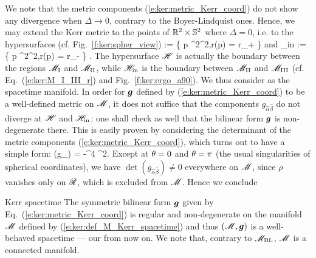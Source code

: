 We note that the metric components (\ref{e:ker:metric_Kerr_coord}) do not show any divergence when
$\Delta\rightarrow 0$, contrary to the Boyer-Lindquist ones. Hence, we may extend
the Kerr metric to the points of $\mathbb{R}^2\times\mathbb{S}^2$ where $\Delta=0$, i.e.
to the hypersurfaces (cf. Fig.~\ref{f:ker:spher_view})
\be \label{e:ker:def_H}
    \Hor := \left\{ p \in \R^2\times\SS^2,\quad r(p) = r_+ \right\}
\ee
and
\be \label{e:ker:def_H_in}
    \Hor_{\rm in} := \left\{ p \in \R^2\times\SS^2,\quad r(p) = r_- \right\} .
\ee
The hypersurface $\mathscr{H}$ is actually the boundary between the regions $\mathscr{M}_{\rm I}$
and $\mathscr{M}_{\rm II}$, while $\mathscr{H}_{\rm in}$ is the boundary between $\mathscr{M}_{\rm II}$
and $\mathscr{M}_{\rm III}$ (cf. Eq.~(\ref{e:ker:M_I_III_r}) and Fig.~\ref{f:ker:ergo_a90}).
We thus consider
\be \label{e:ker:def_M_Kerr_spacetime}
\ee
as the spacetime manifold. In order for $\bm{g}$ defined by (\ref{e:ker:metric_Kerr_coord})
to be a well-defined metric on $\mathscr{M}$, it does not suffice that the components
$g_{\hat{\alpha}\hat{\beta}}$ do not diverge at $\mathscr{H}$ and $\mathscr{H}_{\rm in}$: one shall
check as well that the bilinear form $\bm{g}$ is non-degenerate there.
This is easily proven by considering the determinant of the metric components
(\ref{e:ker:metric_Kerr_coord}),
which turns out to have a simple form:
\be
    \det (g_{\hat{\alpha}\hat{\beta}}) = -\rho^4 \sin^2\th .
\ee
Except at $\theta=0$ and $\theta=\pi$ (the usual singularities of spherical coordinates),
we have $\det (g_{\hat{\alpha}\hat{\beta}}) \neq 0$ everywhere on $\mathscr{M}$, since
$\rho$ vanishes only on $\mathscr{R}$, which is excluded from $\mathscr{M}$.
Hence we conclude
\begin{tprop}{Kerr spacetime}{}
The symmetric bilinear form $\bm{g}$ given by Eq.~(\ref{e:ker:metric_Kerr_coord})
is regular and non-degenerate on the manifold $\mathscr{M}$
defined by (\ref{e:ker:def_M_Kerr_spacetime}) and thus
$(\mathscr{M},\bm{g})$ is a well-behaved spacetime --- our 
from now on. We note that, contrary to $\mathscr{M}_{\rm BL}$, $\mathscr{M}$ is a connected manifold.
\end{tprop}

